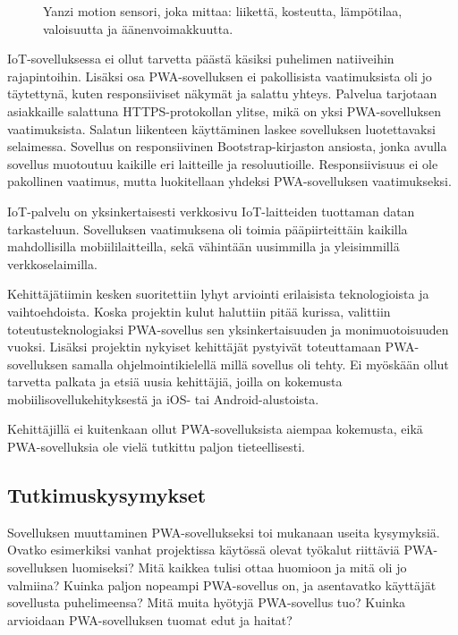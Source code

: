 \documentclass{tktltiki}
\begin{document}
\begin{figure}[!htbp]
\begin{center}
\caption{Yanzi motion sensori, joka mittaa: liikettä, kosteutta, lämpötilaa, valoisuutta ja äänenvoimakkuutta.}
\label{Yanzi sensori}
\end{center}
\end{figure}

IoT-sovelluksessa ei ollut tarvetta päästä käsiksi puhelimen natiiveihin rajapintoihin. Lisäksi osa PWA-sovelluksen ei pakollisista vaatimuksista oli jo täytettynä, kuten responsiiviset näkymät ja salattu yhteys. Palvelua tarjotaan asiakkaille salattuna HTTPS-protokollan ylitse, mikä on yksi PWA-sovelluksen vaatimuksista. Salatun liikenteen käyttäminen laskee sovelluksen luotettavaksi selaimessa. Sovellus on responsiivinen Bootstrap-kirjaston ansiosta, jonka avulla sovellus muotoutuu kaikille eri laitteille ja resoluutioille. Responsiivisuus ei ole pakollinen vaatimus, mutta luokitellaan yhdeksi PWA-sovelluksen vaatimukseksi.

IoT-palvelu on yksinkertaisesti verkkosivu IoT-laitteiden tuottaman datan tarkasteluun. Sovelluksen vaatimuksena oli toimia pääpiirteittäin kaikilla mahdollisilla mobiililaitteilla, sekä vähintään uusimmilla ja yleisimmillä verkkoselaimilla.

Kehittäjätiimin kesken suoritettiin lyhyt arviointi erilaisista teknologioista ja vaihtoehdoista. Koska projektin kulut haluttiin pitää kurissa, valittiin toteutusteknologiaksi PWA-sovellus sen yksinkertaisuuden ja monimuotoisuuden vuoksi. Lisäksi projektin nykyiset kehittäjät pystyivät toteuttamaan PWA-sovelluksen samalla ohjelmointikielellä millä sovellus oli tehty. Ei myöskään ollut tarvetta palkata ja etsiä uusia kehittäjiä, joilla on kokemusta mobiilisovellukehityksestä ja iOS- tai Android-alustoista.

Kehittäjillä ei kuitenkaan ollut PWA-sovelluksista aiempaa kokemusta, eikä PWA-sovelluksia ole vielä tutkittu paljon tieteellisesti.

\subsection{Tutkimuskysymykset}

Sovelluksen muuttaminen PWA-sovellukseksi toi mukanaan useita kysymyksiä. Ovatko esimerkiksi vanhat projektissa käytössä olevat työkalut riittäviä PWA-sovelluksen luomiseksi? Mitä kaikkea tulisi ottaa huomioon ja mitä oli jo valmiina? Kuinka paljon nopeampi PWA-sovellus on, ja asentavatko käyttäjät sovellusta puhelimeensa? Mitä muita hyötyjä PWA-sovellus tuo? Kuinka arvioidaan PWA-sovelluksen tuomat edut ja haitat?
\end{document}
